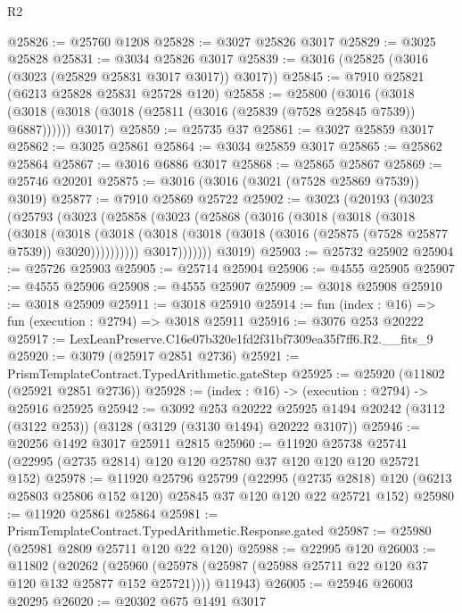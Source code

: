 \begin{lexlean}{R2}
\begin{coremodule}
@25826 := @25760 @1208
@25828 := @3027 @25826 @3017
@25829 := @3025 @25828
@25831 := @3034 @25826 @3017
@25839 := @3016 (@25825 (@3016 (@3023 (@25829 @25831 @3017 @3017)) @3017))
@25845 := @7910 @25821 (@6213 @25828 @25831 @25728 @120)
@25858 := @25800
    (@3016
      (@3018 (@3018 (@3018 (@3018 (@25811 (@3016 (@25839 (@7528 @25845 @7539)) @6887))))))
      @3017)
@25859 := @25735 @37
@25861 := @3027 @25859 @3017
@25862 := @3025 @25861
@25864 := @3034 @25859 @3017
@25865 := @25862 @25864
@25867 := @3016 @6886 @3017
@25868 := @25865 @25867
@25869 := @25746 @20201
@25875 := @3016 (@3016 (@3021 (@7528 @25869 @7539)) @3019)
@25877 := @7910 @25869 @25722
@25902 := @3023
    (@20193
      (@3023
        (@25793
          (@3023
            (@25858
              (@3023
                (@25868
                  (@3016
                    (@3018
                      (@3018
                        (@3018
                          (@3018
                            (@3018
                              (@3018
                                (@3018
                                  (@3018 (@3018 (@3016 (@25875 (@7528 @25877 @7539)) @3020))))))))))
                    @3017)))))))
      @3019)
@25903 := @25732 @25902
@25904 := @25726 @25903
@25905 := @25714 @25904
@25906 := @4555 @25905
@25907 := @4555 @25906
@25908 := @4555 @25907
@25909 := @3018 @25908
@25910 := @3018 @25909
@25911 := @3018 @25910
@25914 := fun (index : @16) => fun (execution : @2794) => @3018 @25911
@25916 := @3076 @253 @20222
@25917 := LexLeanPreserve.C16e07b320e1fd2f31bf7309ea35f7ff6.R2.__fits_9
@25920 := @3079 (@25917 @2851 @2736)
@25921 := PrismTemplateContract.TypedArithmetic.gateStep
@25925 := @25920 (@11802 (@25921 @2851 @2736))
@25928 := (index : @16) -> (execution : @2794) -> @25916 @25925
@25942 := @3092
    @253
    @20222
    @25925
    @1494
    @20242
    (@3112 (@3122 @253))
    (@3128 (@3129 (@3130 @1494) @20222 @3107))
@25946 := @20256 @1492 @3017 @25911 @2815
@25960 := @11920
    @25738
    @25741
    (@22995 (@2735 @2814) @120 @120 @25780 @37 @120 @120 @120 @25721 @152)
@25978 := @11920
    @25796
    @25799
    (@22995 (@2735 @2818) @120 (@6213 @25803 @25806 @152 @120) @25845 @37 @120 @120 @22 @25721 @152)
@25980 := @11920 @25861 @25864
@25981 := PrismTemplateContract.TypedArithmetic.Response.gated
@25987 := @25980 (@25981 @2809 @25711 @120 @22 @120)
@25988 := @22995 @120
@26003 := @11802
    (@20262
      (@25960 (@25978 (@25987 (@25988 @25711 @22 @120 @37 @120 @132 @25877 @152 @25721))))
      @11943)
@26005 := @25946 @26003 @20295
@26020 := @20302
    @675
    @1491
    @3017

\end{coremodule}
\end{lexlean}
